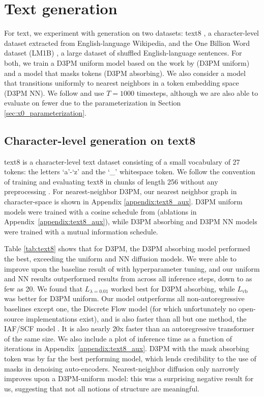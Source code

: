 \section{Text generation}

For text, we experiment with generation on two datasets: text8 \citep{text8}, a character-level dataset extracted from English-language Wikipedia, and the One Billion Word dataset (LM1B) \citep{lm1b}, a large dataset of shuffled English-language sentences. For both, we train a D3PM uniform model based on the work by \citet{hoogeboom2021argmax} (D3PM uniform) and a model that masks tokens (D3PM absorbing). We also consider a model that transitions uniformly to nearest neighbors in a token embedding space (D3PM NN). We follow \citet{hoogeboom2021argmax} and use $T=1000$ timesteps, although we are also able to evaluate on fewer due to the parameterization in Section \ref{sec:x0_parameterization}.

\subsection{Character-level generation on text8}


text8 is a character-level text dataset consisting of a small vocabulary of 27 tokens: the letters `a'-`z' and the `\_' whitespace token. We follow the convention of training and evaluating text8 in chunks of length 256 without any preprocessing \citep{hoogeboom2021argmax}. For nearest-neighbor D3PM, our nearest neighbor graph in character-space is shown in Appendix \ref{appendix:text8_aux}. D3PM uniform models were trained with a cosine schedule from \citet{hoogeboom2021argmax} (ablations in Appendix~\ref{appendix:text8_aux}), while D3PM absorbing and D3PM NN models were trained with a mutual information schedule.

Table \ref{tab:text8} shows that for D3PM, the D3PM absorbing model performed the best, exceeding the uniform and NN diffusion models. We were able to improve upon the baseline result of \citep{hoogeboom2021argmax} with hyperparameter tuning, and our uniform and NN results outperformed results from \citet{hoogeboom2021argmax} across all inference steps, down to as few as 20. We found that $L_{\lambda=0.01}$ worked best for D3PM absorbing, while $L_{\mathrm{vb}}$ was better for D3PM uniform. Our model outperforms all non-autoregressive baselines except one, the Discrete Flow model \citep{tran2019discrete} 
(for which unfortunately no open-source implementations exist), and is also faster than all but one method, the IAF/SCF model \citep{Ziegler2019}. It is also nearly 20x faster than an autoregressive transformer of the same size. We also include a plot of inference time as a function of iterations in Appendix~\ref{appendix:text8_aux}.
D3PM with the mask absorbing token was by far the best performing model, which lends credibility to the use of masks in denoising auto-encoders. Nearest-neighbor diffusion only narrowly improves upon a D3PM-uniform model: this was a surprising negative result for us, suggesting that not all notions of structure are meaningful.

